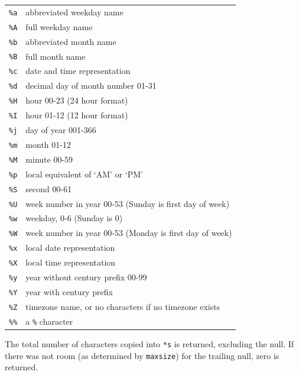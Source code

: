 \begin{description}
   \begin{tabular}{ll}
     \toprule
     \texttt{\%a} & abbreviated weekday name     \\
     \texttt{\%A} & full weekday name     \\
     \texttt{\%b} & abbreviated month name     \\
     \texttt{\%B} & full month name     \\
     \texttt{\%c} & date and time representation     \\
     \texttt{\%d} & decimal day of month number 01-31     \\
     \texttt{\%H} & hour 00-23 (24 hour format)     \\
     \texttt{\%I} & hour 01-12 (12 hour format)     \\
     \texttt{\%j} & day of year 001-366     \\
     \texttt{\%m} & month 01-12     \\
     \texttt{\%M} & minute 00-59     \\
     \texttt{\%p} & local equivalent of `AM' or `PM'     \\
     \texttt{\%S} & second 00-61     \\
     \texttt{\%U} & week number in year 00-53
                    (Sunday  is  first  day  of week)     \\
     \texttt{\%w} & weekday, 0-6 (Sunday is 0)     \\
     \texttt{\%W} & week number in year 00-53
                    (Monday  is  first  day  of week)     \\
     \texttt{\%x} & local date representation     \\
     \texttt{\%X} & local time representation     \\
     \texttt{\%y} & year without century prefix 00-99     \\
     \texttt{\%Y} & year with century prefix     \\
     \texttt{\%Z} & timezone name, or no characters if no timezone exists  \\
     \texttt{\%\%} & a \texttt{\%} character     \\
     \bottomrule
   \end{tabular}


    The  total  number  of  characters  copied  into  \texttt{*s}   is
     returned,  excluding the null.  If there was not room (as determined by
     \texttt{maxsize}) for the  trailing  null,  zero  is returned.

   
  \end{description}

